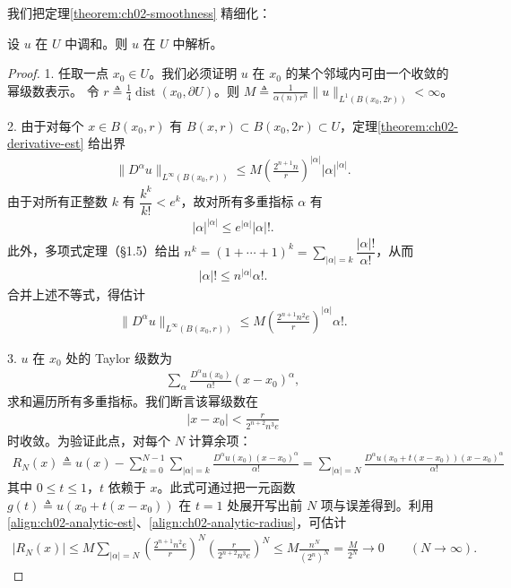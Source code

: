 \documentclass[../../main.tex]{subfiles}
\begin{document}
我们把定理\cref{theorem:ch02-smoothness} 精细化：

\begin{theorem}[解析性]\label{theorem:ch02-analyticity}设 $u$ 在 $U$ 中调和。则 $u$ 在 $U$ 中解析。
\end{theorem}

\begin{proof}
1. 任取一点 $x_0\in U$。我们必须证明 $u$ 在 $x_0$ 的某个邻域内可由一个收敛的幂级数表示。
令 $r\triangleq\frac{1}{4}\operatorname{dist}(x_0,\partial U)$。则 $M\triangleq\frac{1}{\alpha(n)r^n}\|u\|_{L^1(B(x_0,2r))}<\infty$。

2. 由于对每个 $x\in B(x_0,r)$ 有 $B(x,r)\subset B(x_0,2r)\subset U$，定理\cref{theorem:ch02-derivative-est} 给出界
\begin{align*}
\|D^\alpha u\|_{L^\infty(B(x_0,r))}\leqslant M\left(\frac{2^{n+1}n}{r}\right)^{|\alpha|}|\alpha|^{|\alpha|}.
\end{align*}
由于对所有正整数 $k$ 有 $\dfrac{k^k}{k!}<e^k$，故对所有多重指标 $\alpha$ 有
\begin{align*}
|\alpha|^{|\alpha|}\leqslant e^{|\alpha|}|\alpha|!.
\end{align*}
此外，多项式定理（\S1.5）给出 $n^k=(1+\cdots+1)^k=\sum_{|\alpha|=k}\dfrac{|\alpha|!}{\alpha!}$，从而
\begin{align*}
|\alpha|!\leqslant n^{|\alpha|}\alpha!.
\end{align*}
合并上述不等式，得估计
\begin{align}\label{align:ch02-analytic-est}
\|D^\alpha u\|_{L^\infty(B(x_0,r))}\leqslant M\left(\frac{2^{n+1}n^2e}{r}\right)^{|\alpha|}\alpha!.
\end{align}

3. $u$ 在 $x_0$ 处的 Taylor 级数为
\begin{align*}
\sum_\alpha\frac{D^\alpha u(x_0)}{\alpha!}(x-x_0)^\alpha,
\end{align*}
求和遍历所有多重指标。我们断言该幂级数在
\begin{align}\label{align:ch02-analytic-radius}
|x-x_0|<\frac{r}{2^{n+2}n^3e}
\end{align}
时收敛。为验证此点，对每个 $N$ 计算余项：
\begin{align*}
R_N(x)\triangleq u(x)-\sum_{k=0}^{N-1}\sum_{|\alpha|=k}\frac{D^\alpha u(x_0)(x-x_0)^\alpha}{\alpha!}=\sum_{|\alpha|=N}\frac{D^\alpha u(x_0+t(x-x_0))(x-x_0)^\alpha}{\alpha!}
\end{align*}
其中 $0\leqslant t\leqslant 1$，$t$ 依赖于 $x$。此式可通过把一元函数 $g(t)\triangleq u(x_0+t(x-x_0))$ 在 $t=1$ 处展开写出前 $N$ 项与误差得到。利用\eqref{align:ch02-analytic-est}、\eqref{align:ch02-analytic-radius}，可估计
\begin{align*}
|R_N(x)|\leqslant M\sum_{|\alpha|=N}\left(\frac{2^{n+1}n^2e}{r}\right)^N\left(\frac{r}{2^{n+2}n^3e}\right)^N
\leqslant M\frac{n^N}{(2^n)^N}=\frac{M}{2^N}\to 0 \qquad (N\to\infty).
\end{align*}
\end{proof}
\end{document}
